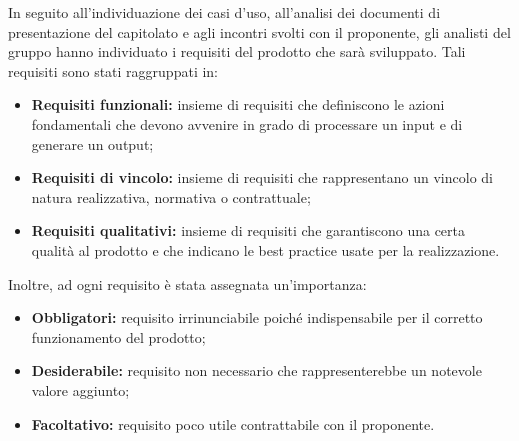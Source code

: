 In seguito all'individuazione dei casi d'uso, all'analisi dei documenti di presentazione del capitolato e agli incontri svolti con il proponente, gli analisti del gruppo \Gruppo{} hanno individuato i requisiti del prodotto che sar\`{a} sviluppato. Tali requisiti sono stati raggruppati in:

\begin{itemize}
    \item \textbf{Requisiti funzionali:} insieme di requisiti che definiscono le azioni fondamentali che devono avvenire in grado di processare un input e di generare un output;
    \item  \textbf{Requisiti di vincolo:} insieme di requisiti che rappresentano un vincolo di natura realizzativa, normativa o contrattuale;
    \item \textbf{Requisiti qualitativi:} insieme di requisiti che garantiscono una certa qualit\`{a} al prodotto e che indicano le best practice usate per la realizzazione.
\end{itemize}

Inoltre, ad ogni requisito \`{e} stata assegnata un'importanza:

\begin{itemize}
    \item \textbf{Obbligatori:} requisito irrinunciabile poich\'{e} indispensabile per il corretto funzionamento del prodotto;
    \item \textbf{Desiderabile:} requisito non necessario che rappresenterebbe un notevole valore aggiunto;
    \item \textbf{Facoltativo:} requisito poco utile contrattabile con il proponente.
\end{itemize}